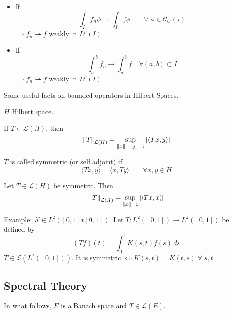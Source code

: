 \begin{itemize}
    \item If 
    \[
        \int_I f_n \phi \to \int_I f \phi \qquad \forall \; \phi \in \mathcal{C}_C(I)
    \]
    \(\Rightarrow f_n \rightharpoonup f\) weakly in \(L^p(I)\)
    \item If 
    \[
        \int_a^b f_n \to \int_a^b f \quad \forall (a, b) \subset I
    \]
    \(\Rightarrow f_n \rightharpoonup f\) weakly in \(L^p(I)\)
\end{itemize}

Some useful facts on bounded operators in Hilbert Spaces.

\(H\) Hilbert space. 
\begin{proposition}
    If \(T \in \mathcal{L}(H)\), then
    \[
        \norm{T}_{\mathcal{L}(H)} = \sup_{\norm{x}=\norm{y}=1} \abs{\langle Tx, y\rangle  }
    \]
\end{proposition}
\begin{definition}
    \(T \) is called symmetric (or self adjoint) if 
    \[
        \langle Tx, y\rangle   = \langle x, Ty\rangle   \qquad \forall x, y \in H
    \]
\end{definition}
\begin{proposition}
    Let \(T \in \mathcal{L}(H)\) be symmetric. Then 
    \[
        \norm{T}_{\mathcal{L}(H)} = \sup_{\norm{x}= 1} \abs{\langle Tx, x\rangle  }
    \]
\end{proposition}

Example: \(K \in L^2([0, 1]x[0, 1])\). Let \(T: L^2([0, 1]) \to L^2([0, 1])\) be defined by 
\[
    (Tf)(t) = \int_0^1 K(s, t) f(s) \,ds
\]
\(T \in \mathcal{L}(L^2([0, 1]))\). It is symmetric \(\iff K(s, t) = K(t, s)\) \(\forall \; s, t\)

\subsection*{Spectral Theory}
In what follows, \(E\) is a Banach space and \(T \in \mathcal{L}(E)\).

